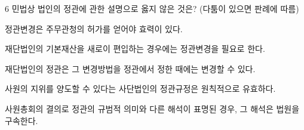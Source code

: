 \begin{question}{6}
민법상 법인의 정관에 관한 설명으로 옳지 않은 것은? (다툼이 있으면 판례에 따름)
\begin{choices}
  \item 정관변경은 주무관청의 허가를 얻어야 효력이 있다.
  \item 재단법인의 기본재산을 새로이 편입하는 경우에는 정관변경을 필요로 한다.
  \item 재단법인의 정관은 그 변경방법을 정관에서 정한 때에는 변경할 수 있다.
  \item 사원의 지위를 양도할 수 있다는 사단법인의 정관규정은 원칙적으로 유효하다.
  \item 사원총회의 결의로 정관의 규범적 의미와 다른 해석이 표명된 경우, 그 해석은 법원을 구속한다.
\end{choices}
\end{question}
